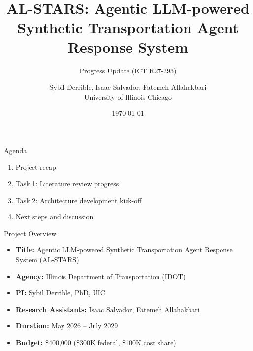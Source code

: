 \documentclass{beamer}
\title{AL-STARS: Agentic LLM-powered Synthetic Transportation Agent Response System}
\subtitle{Progress Update (ICT R27-293)}
\author{Sybil Derrible, Isaac Salvador, Fatemeh Allahakbari\\University of Illinois Chicago}
\date{\today}
\begin{document}
\maketitle
{} %




\begin{frame}{Agenda}
\begin{enumerate}
\item Project recap
\item Task 1: Literature review progress
\item Task 2: Architecture development kick-off
\item Next steps and discussion
\end{enumerate}
\end{frame}


\begin{frame}{Project Overview}
\begin{itemize}
\item \textbf{Title:} Agentic LLM-powered Synthetic Transportation Agent Response System (AL-STARS)
\item \textbf{Agency:} Illinois Department of Transportation (IDOT)
\item \textbf{PI:} Sybil Derrible, PhD, UIC
\item \textbf{Research Assistants:} Isaac Salvador, Fatemeh Allahakbari
\item \textbf{Duration:} May 2026 -- July 2029
\item \textbf{Budget:} \$400,000 (\$300K federal, \$100K cost share)
\end{itemize}
\end{frame}
\end{document}
